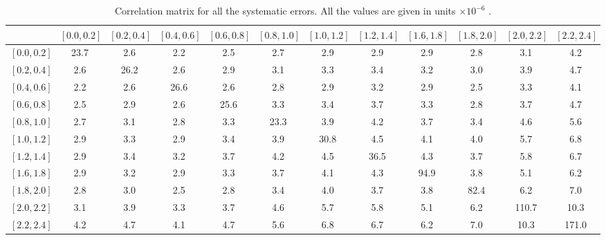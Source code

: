 \begin{table}[htbp]
   \begin{center}
      \begin{sideways}
      \begin{tabular}{l|ccccccccccc}
\midrule
& \scriptsize{$\left[0.0,0.2\right]$}
& \scriptsize{$\left[0.2,0.4\right]$}
& \scriptsize{$\left[0.4,0.6\right]$}
& \scriptsize{$\left[0.6,0.8\right]$}
& \scriptsize{$\left[0.8,1.0\right]$}
& \scriptsize{$\left[1.0,1.2\right]$}
& \scriptsize{$\left[1.2,1.4\right]$}
& \scriptsize{$\left[1.6,1.8\right]$}
& \scriptsize{$\left[1.8,2.0\right]$}
& \scriptsize{$\left[2.0,2.2\right]$}
& \scriptsize{$\left[2.2,2.4\right]$} \\ \midrule
\scriptsize{$\left[0.0,0.2\right]$} & 23.7 & 2.6 & 2.2 & 2.5 & 2.7 & 2.9 & 2.9 & 2.9 & 2.8 & 3.1 & 4.2 \\
\scriptsize{$\left[0.2,0.4\right]$} & 2.6 & 26.2 & 2.6 & 2.9 & 3.1 & 3.3 & 3.4 & 3.2 & 3.0 & 3.9 & 4.7 \\
\scriptsize{$\left[0.4,0.6\right]$} & 2.2 & 2.6 & 26.6 & 2.6 & 2.8 & 2.9 & 3.2 & 2.9 & 2.5 & 3.3 & 4.1 \\
\scriptsize{$\left[0.6,0.8\right]$} & 2.5 & 2.9 & 2.6 & 25.6 & 3.3 & 3.4 & 3.7 & 3.3 & 2.8 & 3.7 & 4.7 \\
\scriptsize{$\left[0.8,1.0\right]$} & 2.7 & 3.1 & 2.8 & 3.3 & 23.3 & 3.9 & 4.2 & 3.7 & 3.4 & 4.6 & 5.6 \\
\scriptsize{$\left[1.0,1.2\right]$} & 2.9 & 3.3 & 2.9 & 3.4 & 3.9 & 30.8 & 4.5 & 4.1 & 4.0 & 5.7 & 6.8 \\
\scriptsize{$\left[1.2,1.4\right]$} & 2.9 & 3.4 & 3.2 & 3.7 & 4.2 & 4.5 & 36.5 & 4.3 & 3.7 & 5.8 & 6.7 \\
\scriptsize{$\left[1.6,1.8\right]$} & 2.9 & 3.2 & 2.9 & 3.3 & 3.7 & 4.1 & 4.3 & 94.9 & 3.8 & 5.1 & 6.2 \\
\scriptsize{$\left[1.8,2.0\right]$} & 2.8 & 3.0 & 2.5 & 2.8 & 3.4 & 4.0 & 3.7 & 3.8 & 82.4 & 6.2 & 7.0 \\
\scriptsize{$\left[2.0,2.2\right]$} & 3.1 & 3.9 & 3.3 & 3.7 & 4.6 & 5.7 & 5.8 & 5.1 & 6.2 & 110.7 & 10.3 \\
\scriptsize{$\left[2.2,2.4\right]$} & 4.2 & 4.7 & 4.1 & 4.7 & 5.6 & 6.8 & 6.7 & 6.2 & 7.0 & 10.3 & 171.0 \\
\bottomrule
    \end{tabular}
    \end{sideways}
    \end{center}
  \caption[Correlation matrix for all the systematic errors.]
{\label{tab:corr_tot}Correlation matrix for all the systematic errors.  All the
values are given in units $\times 10^{-6}$ \cite{bendavid2011electron}.}
\end{table}

